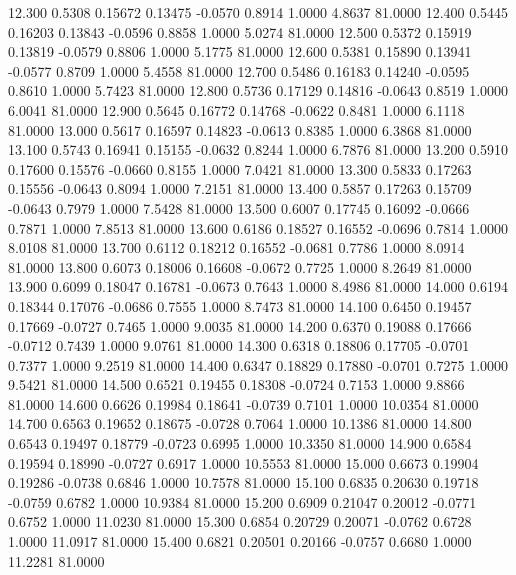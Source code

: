   12.300   0.5308   0.15672   0.13475  -0.0570   0.8914   1.0000   4.8637  81.0000
  12.400   0.5445   0.16203   0.13843  -0.0596   0.8858   1.0000   5.0274  81.0000
  12.500   0.5372   0.15919   0.13819  -0.0579   0.8806   1.0000   5.1775  81.0000
  12.600   0.5381   0.15890   0.13941  -0.0577   0.8709   1.0000   5.4558  81.0000
  12.700   0.5486   0.16183   0.14240  -0.0595   0.8610   1.0000   5.7423  81.0000
  12.800   0.5736   0.17129   0.14816  -0.0643   0.8519   1.0000   6.0041  81.0000
  12.900   0.5645   0.16772   0.14768  -0.0622   0.8481   1.0000   6.1118  81.0000
  13.000   0.5617   0.16597   0.14823  -0.0613   0.8385   1.0000   6.3868  81.0000
  13.100   0.5743   0.16941   0.15155  -0.0632   0.8244   1.0000   6.7876  81.0000
  13.200   0.5910   0.17600   0.15576  -0.0660   0.8155   1.0000   7.0421  81.0000
  13.300   0.5833   0.17263   0.15556  -0.0643   0.8094   1.0000   7.2151  81.0000
  13.400   0.5857   0.17263   0.15709  -0.0643   0.7979   1.0000   7.5428  81.0000
  13.500   0.6007   0.17745   0.16092  -0.0666   0.7871   1.0000   7.8513  81.0000
  13.600   0.6186   0.18527   0.16552  -0.0696   0.7814   1.0000   8.0108  81.0000
  13.700   0.6112   0.18212   0.16552  -0.0681   0.7786   1.0000   8.0914  81.0000
  13.800   0.6073   0.18006   0.16608  -0.0672   0.7725   1.0000   8.2649  81.0000
  13.900   0.6099   0.18047   0.16781  -0.0673   0.7643   1.0000   8.4986  81.0000
  14.000   0.6194   0.18344   0.17076  -0.0686   0.7555   1.0000   8.7473  81.0000
  14.100   0.6450   0.19457   0.17669  -0.0727   0.7465   1.0000   9.0035  81.0000
  14.200   0.6370   0.19088   0.17666  -0.0712   0.7439   1.0000   9.0761  81.0000
  14.300   0.6318   0.18806   0.17705  -0.0701   0.7377   1.0000   9.2519  81.0000
  14.400   0.6347   0.18829   0.17880  -0.0701   0.7275   1.0000   9.5421  81.0000
  14.500   0.6521   0.19455   0.18308  -0.0724   0.7153   1.0000   9.8866  81.0000
  14.600   0.6626   0.19984   0.18641  -0.0739   0.7101   1.0000  10.0354  81.0000
  14.700   0.6563   0.19652   0.18675  -0.0728   0.7064   1.0000  10.1386  81.0000
  14.800   0.6543   0.19497   0.18779  -0.0723   0.6995   1.0000  10.3350  81.0000
  14.900   0.6584   0.19594   0.18990  -0.0727   0.6917   1.0000  10.5553  81.0000
  15.000   0.6673   0.19904   0.19286  -0.0738   0.6846   1.0000  10.7578  81.0000
  15.100   0.6835   0.20630   0.19718  -0.0759   0.6782   1.0000  10.9384  81.0000
  15.200   0.6909   0.21047   0.20012  -0.0771   0.6752   1.0000  11.0230  81.0000
  15.300   0.6854   0.20729   0.20071  -0.0762   0.6728   1.0000  11.0917  81.0000
  15.400   0.6821   0.20501   0.20166  -0.0757   0.6680   1.0000  11.2281  81.0000
